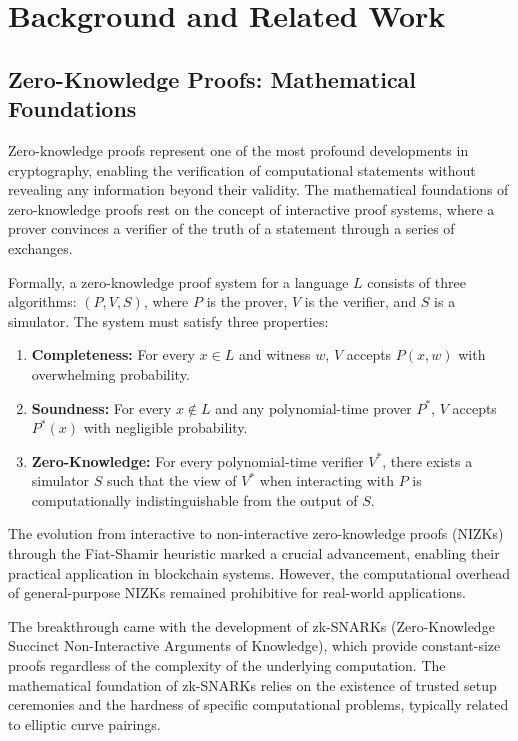 \documentclass[11pt,a4paper]{article}
\begin{document}
\section{Background and Related Work}

\subsection{Zero-Knowledge Proofs: Mathematical Foundations}

Zero-knowledge proofs represent one of the most profound developments in cryptography, enabling the verification of computational statements without revealing any information beyond their validity. The mathematical foundations of zero-knowledge proofs rest on the concept of interactive proof systems, where a prover convinces a verifier of the truth of a statement through a series of exchanges.

Formally, a zero-knowledge proof system for a language $L$ consists of three algorithms: $(P, V, S)$, where $P$ is the prover, $V$ is the verifier, and $S$ is a simulator. The system must satisfy three properties:

\begin{enumerate}
    \item \textbf{Completeness:} For every $x \in L$ and witness $w$, $V$ accepts $P(x,w)$ with overwhelming probability.
    \item \textbf{Soundness:} For every $x \notin L$ and any polynomial-time prover $P^*$, $V$ accepts $P^*(x)$ with negligible probability.
    \item \textbf{Zero-Knowledge:} For every polynomial-time verifier $V^*$, there exists a simulator $S$ such that the view of $V^*$ when interacting with $P$ is computationally indistinguishable from the output of $S$.
\end{enumerate}

The evolution from interactive to non-interactive zero-knowledge proofs (NIZKs) through the Fiat-Shamir heuristic marked a crucial advancement, enabling their practical application in blockchain systems. However, the computational overhead of general-purpose NIZKs remained prohibitive for real-world applications.

The breakthrough came with the development of zk-SNARKs (Zero-Knowledge Succinct Non-Interactive Arguments of Knowledge), which provide constant-size proofs regardless of the complexity of the underlying computation. The mathematical foundation of zk-SNARKs relies on the existence of trusted setup ceremonies and the hardness of specific computational problems, typically related to elliptic curve pairings.
\end{document}
